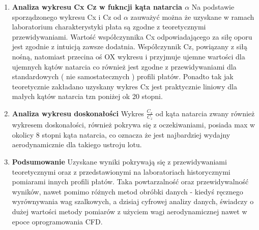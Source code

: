 \begin{enumerate}[itemsep = 4mm, parsep = 3mm, topsep = 5mm, partopsep = 2mm, leftmargin = 0.5cm]

\item \textbf{Analiza wykresu Cx Cz w fukncji kąta natarcia $\alpha$} 
    \akapit Na podstawie sporządzonego wykresu Cx i Cz od $\alpha$ zauważyć można że uzyskane w ramach laboratorium charakterystyki płata są zgodne z teoretycznymi przewidywaniami. Wartość współczynnika Cx odpowiadającego za siłę oporu jest zgodnie z intuicją zawsze dodatnia. Współczynnik Cz, powiązany z siłą nośną, natomiast przecina oś OX wykresu i przyjmuje ujemne wartości dla ujemnych kątów natarcia co również jest zgodne z przewidywaniami dla standardowych ( nie samostatecznych ) profili płatów. Ponadto tak jak teoretycznie zakładano uzyskany wykres Cx jest praktycznie liniowy dla małych kątów natarcia tzn poniżej ok 20 stopni.

\item \textbf{Analiza wykresu doskonałości}
   \akapit Wykres $\frac{C_x}{C_z}$ od kąta natarcia zwany również wykresem doskonałości, również pokrywa się z oczekiwaniami, posiada max w okolicy 8 stopni kąta natarcia, co oznacza że jest najbardziej wydajny aerodynamicznie dla takiego ustroju lotu.

\item \textbf{Podsumowanie}
    \akapit Uzyskane wyniki pokrywają się z przewidywaniami teoretycznymi oraz z przedstawionymi na laboratoriach historycznymi pomiarami innych profili płatów. Taka powtarzalność oraz przewidywalność wyników, nawet pomimo różnych metod obróbki danych - kiedyś ręcznego wyrównywania wag szalkowych, a dzisiaj cyfrowej analizy danych, świadczy o dużej wartości metody pomiarów z użyciem wagi aerodynamicznej nawet w epoce oprogramowania CFD.
\end{enumerate}